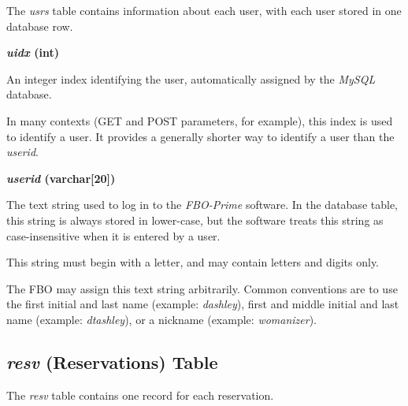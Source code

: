 \documentclass[letterpaper,10pt,titlepage]{article}
\newcommand{\productbasename}{FBO-Prime}
\newenvironment{docdbtblfielddef}{\begin{list}
               {}{\setlength{\labelwidth}{0mm}
                  \setlength{\leftmargin}{10mm}
                  \setlength{\itemindent}{-5mm}
                  \setlength{\parsep}{0.85mm}}}
               {\end{list}}
\begin{document}
The \emph{usrs} table contains information about each user, with each user stored in
one database row.

\begin{docdbtblfielddef}

\item {}\textbf{\emph{uidx} (int)}

An integer index identifying the user, automatically assigned by the
\emph{MySQL} database.

In many contexts (GET and POST parameters, for example), this index is
used to identify a user.  It provides a generally shorter way to identify
a user than the \emph{userid}.

\item {}\textbf{\emph{userid} (varchar[20])}

The text string used to log in to the 
\emph{\productbasename{}} software.  In the database table,
this string is always stored in lower-case, but the software treats
this string as case-insensitive when it is entered by a user.

This string must begin with a letter, and may contain letters and
digits only.

The FBO may assign this text string arbitrarily.  Common conventions
are to use the first initial and last name (example: \emph{dashley}), 
first and middle initial and last name (example: \emph{dtashley}),
or a nickname (example: \emph{womanizer}).
\end{docdbtblfielddef}


\subsection{\emph{resv} (Reservations) Table}
\label{sdtf0:srsv0}

The 
\emph{resv} table contains one record for each reservation.
\end{document}
